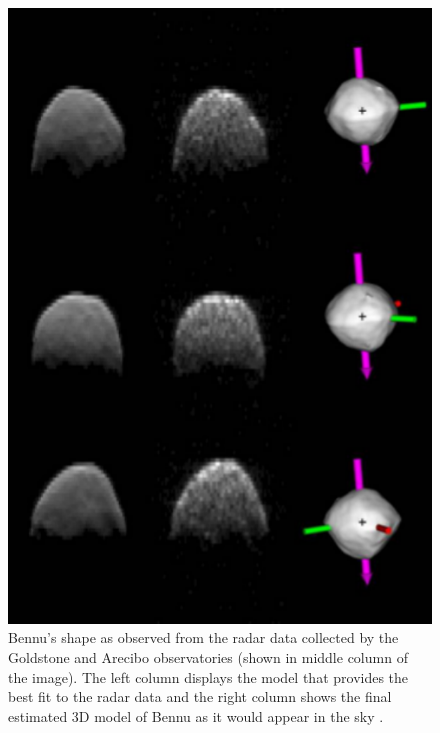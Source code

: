 \begin{figure}[htb]
\centering
\captionsetup{justification=centering}
\includegraphics[width=\linewidth, height=0.4\textheight, keepaspectratio=true]{bennu_shape.pdf}
\caption{Bennu's shape as observed from the radar data collected by the Goldstone and Arecibo observatories (shown in middle column of the image). The left column displays the model that provides the best fit to the radar data and the right column shows the final estimated 3D model of Bennu as it would appear in the sky \parencite{bennuShapeModel}.}
\label{fig:bennu_shape}
\end{figure}
\FloatBarrier

